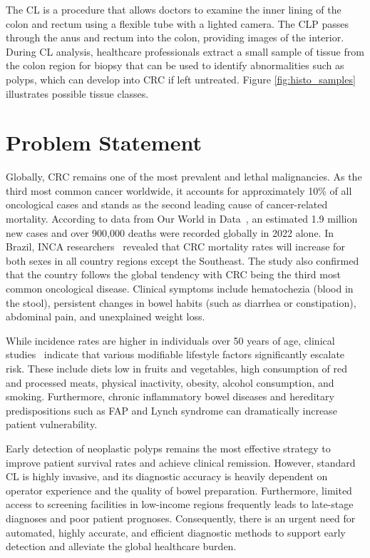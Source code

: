 \label{chap:introduction}

The \gls{CL} is a procedure that allows doctors to examine the inner lining of the colon and rectum using a flexible tube with a lighted camera. The \gls{CLP} passes through the anus and rectum into the colon, providing images of the interior. During \gls{CL} analysis, healthcare professionals extract a small sample of tissue from the colon region for biopsy that can be used to identify abnormalities such as polyps, which can develop into \gls{CRC} if left untreated. Figure \ref{fig:histo_samples} illustrates possible tissue classes.

\section{Problem Statement}
\label{sec_problem}

Globally, \gls{CRC} remains one of the most prevalent and lethal malignancies. As the third most common cancer worldwide, it accounts for approximately 10\% of all oncological cases and stands as the second leading cause of cancer-related mortality. According to data from Our World in Data~\cite{owid-cancer}, an estimated 1.9 million new cases and over 900,000 deaths were recorded globally in 2022 alone. In Brazil, \gls{INCA} researchers~\cite{10.3389/fonc.2022.1060608} revealed that \gls{CRC} mortality rates will increase for both sexes in all country regions except the Southeast. The study also confirmed that the country follows the global tendency with \gls{CRC} being the third most common oncological disease. Clinical symptoms include hematochezia (blood in the stool), persistent changes in bowel habits (such as diarrhea or constipation), abdominal pain, and unexplained weight loss.

While incidence rates are higher in individuals over 50 years of age, clinical studies~\cite{DEKKER20191467} indicate that various modifiable lifestyle factors significantly escalate risk. These include diets low in fruits and vegetables, high consumption of red and processed meats, physical inactivity, obesity, alcohol consumption, and smoking. Furthermore, chronic inflammatory bowel diseases and hereditary predispositions such as \gls{FAP} and Lynch syndrome can dramatically increase patient vulnerability.

Early detection of neoplastic polyps remains the most effective strategy to improve patient survival rates and achieve clinical remission. However, standard \gls{CL} is highly invasive, and its diagnostic accuracy is heavily dependent on operator experience and the quality of bowel preparation. Furthermore, limited access to screening facilities in low-income regions frequently leads to late-stage diagnoses and poor patient prognoses. Consequently, there is an urgent need for automated, highly accurate, and efficient diagnostic methods to support early detection and alleviate the global healthcare burden.


